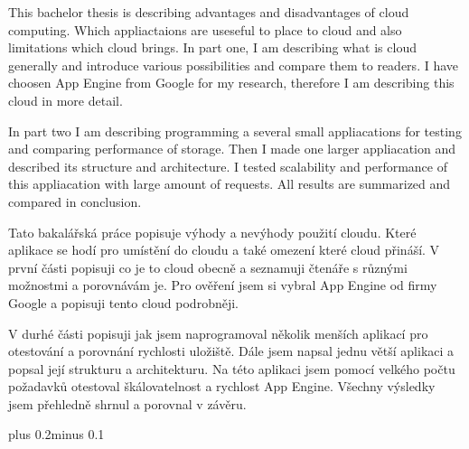 \documentclass[11pt,twoside,a4paper]{book}
\begin{document}
This bachelor thesis is describing advantages and disadvantages of cloud computing. Which appliactaions are useseful to place to cloud and also limitations which cloud brings. In part one, I am describing what is cloud generally and introduce various possibilities and compare them to readers. I have choosen App Engine from Google for my research, therefore I am describing this cloud in more detail.
 
In part two I am describing programming a several small appliacations for testing and comparing performance of storage. Then I made one larger appliacation and described its structure and architecture. I tested scalability and performance of this appliacation with large amount of requests. All results are summarized and compared in conclusion.


\baselineskip

\noindent
Tato bakalářská práce popisuje výhody a nevýhody použití cloudu. Které aplikace se hodí pro umístění do cloudu a také omezení které cloud přináší. V první části popisuji co je to cloud obecně a seznamuji čtenáře s různými možnostmi a porovnávám je. Pro ověření jsem si vybral App Engine od firmy Google a popisuji tento cloud podrobněji.

V durhé části popisuji jak jsem naprogramoval několik menších aplikací pro otestování a porovnání rychlosti uložiště. Dále jsem napsal jednu větší aplikaci a popsal její strukturu a architekturu. Na této aplikaci jsem pomocí velkého počtu požadavků otestoval škálovatelnost a 
rychlost App Engine. Všechny výsledky jsem přehledně shrnul a porovnal v závěru. 



\tableofcontents



\listoffigures



\listoftables



\mainbodystarts
\normalfont
{}\baselineskip plus 0.2\baselineskip minus 0.1\baselineskip
\end{document}
